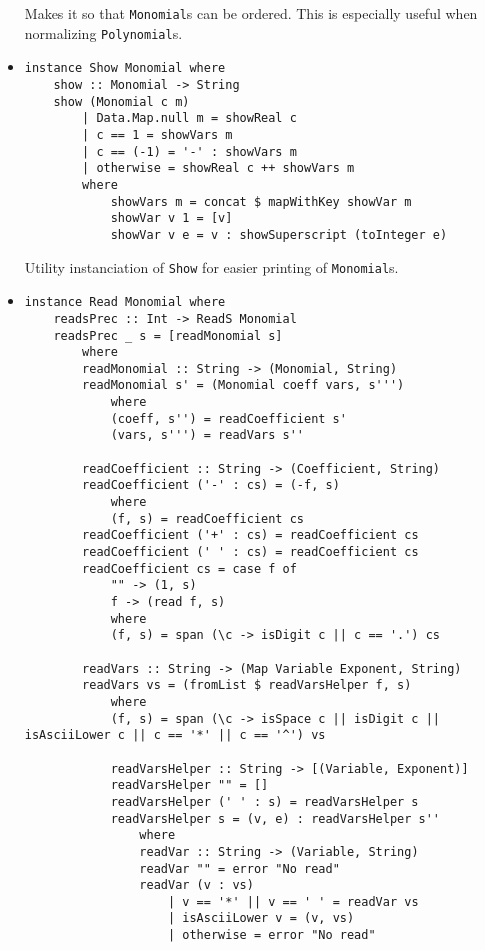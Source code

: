 \documentclass[11pt,a4paper]{article}
\begin{document}
\begin{itemize}
    Makes it so that \lstinline{Monomial}s can be ordered. This is especially useful when normalizing \lstinline{Polynomial}s.

    \item \begin{lstlisting}
instance Show Monomial where
    show :: Monomial -> String
    show (Monomial c m)
        | Data.Map.null m = showReal c
        | c == 1 = showVars m
        | c == (-1) = '-' : showVars m
        | otherwise = showReal c ++ showVars m
        where
            showVars m = concat $ mapWithKey showVar m
            showVar v 1 = [v]
            showVar v e = v : showSuperscript (toInteger e)
    \end{lstlisting}

    Utility instanciation of \lstinline{Show} for easier printing of \lstinline{Monomial}s.

    \item \begin{lstlisting}
instance Read Monomial where
    readsPrec :: Int -> ReadS Monomial
    readsPrec _ s = [readMonomial s]
        where
        readMonomial :: String -> (Monomial, String)
        readMonomial s' = (Monomial coeff vars, s''')
            where
            (coeff, s'') = readCoefficient s'
            (vars, s''') = readVars s''
    
        readCoefficient :: String -> (Coefficient, String)
        readCoefficient ('-' : cs) = (-f, s)
            where
            (f, s) = readCoefficient cs
        readCoefficient ('+' : cs) = readCoefficient cs
        readCoefficient (' ' : cs) = readCoefficient cs
        readCoefficient cs = case f of
            "" -> (1, s)
            f -> (read f, s)
            where
            (f, s) = span (\c -> isDigit c || c == '.') cs
    
        readVars :: String -> (Map Variable Exponent, String)
        readVars vs = (fromList $ readVarsHelper f, s)
            where
            (f, s) = span (\c -> isSpace c || isDigit c || isAsciiLower c || c == '*' || c == '^') vs
    
            readVarsHelper :: String -> [(Variable, Exponent)]
            readVarsHelper "" = []
            readVarsHelper (' ' : s) = readVarsHelper s
            readVarsHelper s = (v, e) : readVarsHelper s''
                where
                readVar :: String -> (Variable, String)
                readVar "" = error "No read"
                readVar (v : vs)
                    | v == '*' || v == ' ' = readVar vs
                    | isAsciiLower v = (v, vs)
                    | otherwise = error "No read"
    

\end{lstlisting}
\end{itemize}
\end{document}

